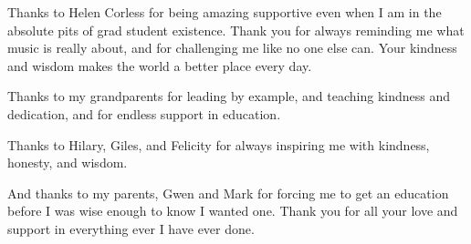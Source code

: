 \begin{fullwidth}
Thanks to Helen Corless for being amazing supportive even when I am in
the absolute pits of grad student existence. Thank you for always
reminding me what music is really about, and for challenging me like
no one else can. Your kindness and wisdom makes the world a better
place every day.

Thanks to my grandparents for leading by example, and teaching
kindness and dedication, and for endless support in education.

Thanks to Hilary, Giles, and Felicity for always inspiring me with
kindness, honesty, and wisdom. 

And thanks to my parents, Gwen and Mark for forcing me to get an
education before I was wise enough to know I wanted one. Thank you for
all your love and support in everything ever I have ever done.
\end{fullwidth}
